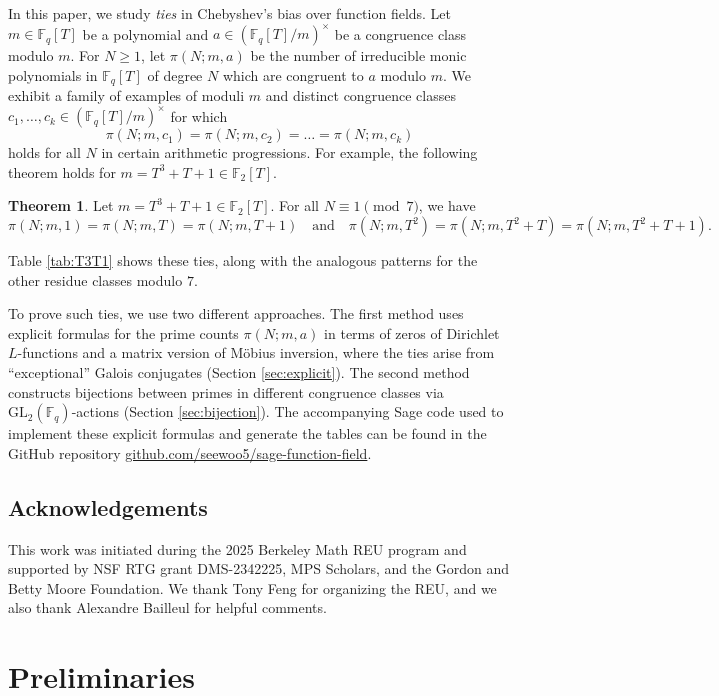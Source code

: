 \documentclass[10pt,reqno]{amsproc}
\newcommand{\GL}{\mathrm{GL}}
\newcommand{\bF}{\mathbb{F}}
\newcommand{\1}{\mathds{1}}	%
\theoremstyle{definition}
\newtheorem{theorem}{Theorem}[section]
\theoremstyle{remark}
\begin{document}
In this paper, we study \emph{ties} in Chebyshev's bias over function fields.
Let $m \in \bF_q[T]$ be a polynomial and $a \in (\bF_q[T] / m)^\times$ be a congruence class modulo $m$.
For $N \ge 1$, let $\pi(N; m, a)$ be the number of irreducible monic polynomials in $\bF_q[T]$ of degree $N$ which are congruent to $a$ modulo $m$.
We exhibit a family of examples of moduli $m$ and distinct congruence classes $c_1, \dots, c_k \in (\bF_q[T] / m)^\times$ for which
\[
\pi(N; m, c_1) = \pi(N; m, c_2) = \dots = \pi(N; m, c_k)
\]
holds for all $N$ in certain arithmetic progressions.
For example, the following theorem holds for \(m = T^3 + T + 1 \in \bF_2[T]\).
\begin{theorem}
    \label{thm:p2T3T1ex}
    Let \(m = T^3 + T + 1 \in \bF_2[T]\).
    For all $N \equiv 1 \pmod{7}$, we have
    \begin{equation}
    \label{eqn:tieN1mod7} 
        \pi(N; m, 1) = \pi(N; m, T) = \pi(N; m, T + 1)\quad\text{and}\quad \pi(N; m, T^2) = \pi(N; m, T^2 + T) = \pi(N; m, T^2 + T + 1).
    \end{equation}
\end{theorem}
Table \ref{tab:T3T1} shows these ties, along with the analogous patterns for the other residue classes modulo $7$.

To prove such ties, we use two different approaches.
The first method uses explicit formulas for the prime counts $\pi(N; m, a)$ in terms of zeros of Dirichlet $L$-functions and a matrix version of M\"obius inversion, where the ties arise from ``exceptional'' Galois conjugates (Section \ref{sec:explicit}).
The second method constructs bijections between primes in different congruence classes via \(\GL_2(\bF_q)\)-actions (Section \ref{sec:bijection}).
The accompanying Sage code used to implement these explicit formulas and generate the tables can be found in the GitHub repository \href{https://github.com/seewoo5/sage-function-field}{github.com/seewoo5/sage-function-field}.

\subsection*{Acknowledgements}

This work was initiated during the 2025 Berkeley Math REU program and supported by NSF RTG grant DMS-2342225, MPS Scholars, and the Gordon and Betty Moore Foundation.
We thank Tony Feng for organizing the REU, and we also thank Alexandre Bailleul for helpful comments.

\section{Preliminaries}
\label{sec:prelim}
\end{document}
